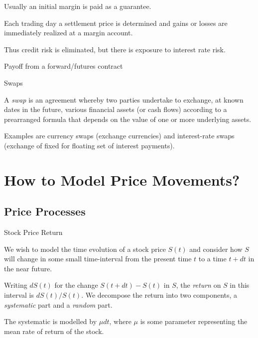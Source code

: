 	Usually an initial margin is paid as a guarantee.

	Each trading day a settlement price is determined and gains or losses are immediately realized at a margin account.

	Thus credit risk is eliminated, but there is exposure to interest rate risk.


{Payoff from a forward/futures contract}
\begin{figure}
  \centering
   \qquad
\end{figure}

{Swaps}


	A {\it swap} is an agreement whereby two parties
undertake to exchange, at known dates in the future, various
financial assets (or cash flows) according to a prearranged
formula that depends on the value of one or more underlying
assets.

	Examples are currency swaps (exchange currencies) and
interest-rate swaps (exchange of fixed for floating set of
interest payments).


\section{How to Model Price Movements?}
\subsection{Price Processes}

{Stock Price Return}


	We wish to model the time evolution of a stock price
$S(t)$ and consider how $S$
will change in some small time-interval from the present time $t$
to a time $t+dt$ in the near future.

	Writing $dS(t)$ for the
change $S(t+dt)-S(t)$ in $S$, the {\it return} on $S$ in this
interval is $dS(t)/S(t)$.
We decompose the return into two components, a {\it systematic}
part and a {\it random} part.

	The systematic is modelled by $\mu dt$, where $\mu$ is some parameter
representing the mean rate of return of the stock.

